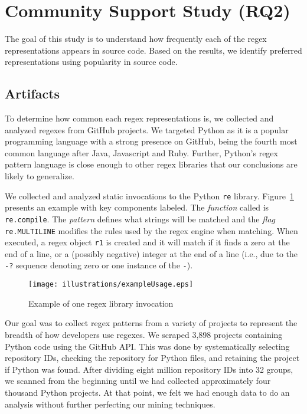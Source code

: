 
\section{Community Support Study (RQ2)}
\label{communitystudy}
The goal of this study is to understand how frequently each of the regex representations appears in source code. Based on the results, we identify preferred representations using popularity in source code.



\subsection{Artifacts}
To determine how common each regex representations is, we collected and analyzed 
regexes from GitHub projects. 
We  targeted Python as it is a popular programming language with a strong presence on GitHub, being the fourth most common language after Java, Javascript and Ruby. Further, Python's regex pattern language is close enough to other regex libraries that our conclusions are likely to generalize.

We collected and analyzed static invocations to the Python {\tt re} library.
Figure~\ref{fig:exampleUsage} presents an example  with key components labeled. The \emph{function} called is {\tt re.compile}.
The \emph{pattern} defines what strings will be matched and the \emph{flag} {\tt re.MULTILINE} modifies the rules used by the regex engine when matching.
When executed, a regex object {\tt r1} is created
and it will  match if it finds a zero at the end of a line, or a (possibly negative) integer at the end of a line (i.e., due to the {\tt -?} sequence denoting zero or one instance of the {\tt -}).

\begin{figure}[tb]
\centering
\texttt{[image: illustrations/exampleUsage.eps]}
\vspace{-12pt}
\caption{Example of one regex library invocation}
\vspace{-6pt}
\label{fig:exampleUsage}
\end{figure}

Our goal was to collect regex patterns from a variety of projects to represent the breadth of how developers use regexes.
We scraped 3,898 projects containing Python code using the GitHub API. This was done by systematically selecting repository IDs, checking the repository for Python files, and retaining the project if Python was found. After dividing eight million repository IDs into 32 groups, we scanned from the beginning until we had collected approximately four thousand Python projects.
At that point, we felt we had enough data
to do an analysis without further perfecting our mining techniques.

